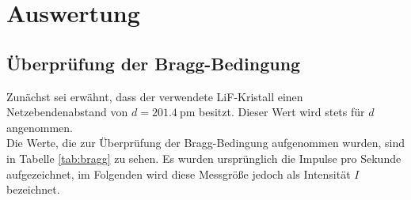 \section{Auswertung}
\label{sec:Auswertung}
\subsection{Überprüfung der Bragg-Bedingung}
\label{subsec:bragg}
Zunächst sei erwähnt, dass der verwendete LiF-Kristall einen Netzebendenabstand von
$d = \SI{201.4}{\pico\meter}$ besitzt. Dieser Wert wird stets für $d$ angenommen.\\
Die Werte, die zur Überprüfung der Bragg-Bedingung aufgenommen wurden, sind in Tabelle
\ref{tab:bragg} zu sehen. Es wurden ursprünglich die Impulse pro Sekunde aufgezeichnet,
im Folgenden wird diese Messgröße jedoch als Intensität $I$ bezeichnet.

